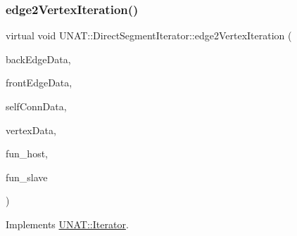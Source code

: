 \subsubsection{\texorpdfstring{edge2VertexIteration()}{edge2VertexIteration()}\hspace{0.1cm}{\footnotesize\ttfamily [1/2]}}
{\footnotesize\ttfamily virtual void U\+N\+A\+T\+::\+Direct\+Segment\+Iterator\+::edge2\+Vertex\+Iteration (\begin{DoxyParamCaption}\item[{\mbox{\hyperlink{structArrays}{Arrays}} $\ast$}]{back\+Edge\+Data,  }\item[{\mbox{\hyperlink{structArrays}{Arrays}} $\ast$}]{front\+Edge\+Data,  }\item[{\mbox{\hyperlink{structArrays}{Arrays}} $\ast$}]{self\+Conn\+Data,  }\item[{\mbox{\hyperlink{structArrays}{Arrays}} $\ast$}]{vertex\+Data,  }\item[{\mbox{\hyperlink{test_2directSegment_2iterator_8h_ae588e578b6781906a44208130df0ab29}{e2v\+\_\+host\+Fun\+Ptr}}}]{fun\+\_\+host,  }\item[{\mbox{\hyperlink{test_2directSegment_2iterator_8h_a7b58029f74760f3ca5384034c0e89c15}{e2v\+\_\+slave\+Fun\+Ptr}}}]{fun\+\_\+slave }\end{DoxyParamCaption})\hspace{0.3cm}{\ttfamily [virtual]}}



Implements \mbox{\hyperlink{classUNAT_1_1Iterator_a59fb9d4c251dd0456078decabf332399}{U\+N\+A\+T\+::\+Iterator}}.

\mbox{\label{classUNAT_1_1DirectSegmentIterator_a4b4de063d998f54f092a3ca779fd818f}} 

